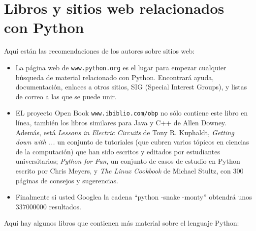 \section{Libros y sitios web relacionados con Python}

Aquí están las recomendaciones de los autores sobre sitios web:

\begin{itemize}

\item La página web de  \texttt{www.python.org} es el lugar para
empezar cualquier búsqueda de material relacionado con Python.  Encontrará
ayuda, documentación, enlaces a otros sitios, SIG (Special Interest
Groups), y listas de correo a las que se puede unir.

\item EL proyecto Open Book \texttt{www.ibiblio.com/obp} no sólo contiene
este libro en línea, también los libros similares para Java y 
C++ de Allen Downey. Además, está {\em Lessons in Electric Circuits} de Tony R.  Kuphaldt, {\em Getting down with ...} un conjunto de tutoriales (que cubren varios
tópicos en ciencias de la computación) que han sido escritos y editados por 
estudiantes universitarios; {\em Python for Fun}, un conjunto
de casos de estudio en Python escrito por  Chris Meyers, y  {\em The Linux
Cookbook} de Michael Stultz, con 300 páginas de consejos y sugerencias.

\item Finalmente si usted Googlea la cadena ``python -snake -monty'' obtendrá
 unos $337000000$ resultados.

\end{itemize}


Aquí hay algunos libros que contienen más material sobre el lenguaje
Python:

